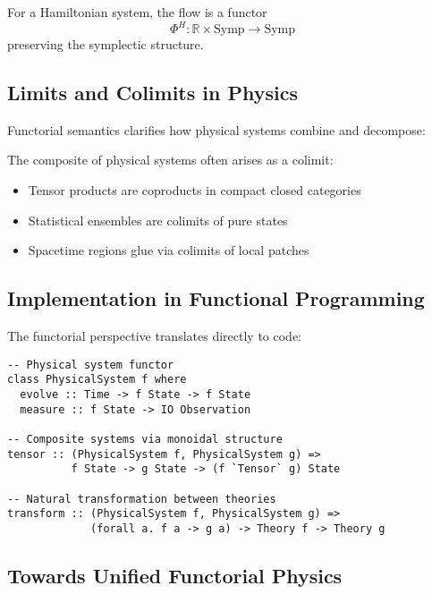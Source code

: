 \begin{example}
For a Hamiltonian system, the flow is a functor
\[
\Phi^H: \mathbb{R} \times \text{Symp} \to \text{Symp}
\]
preserving the symplectic structure.
\end{example}

\subsection{Limits and Colimits in Physics}

Functorial semantics clarifies how physical systems combine and decompose:

\begin{theorem}
The composite of physical systems often arises as a colimit:
\begin{itemize}
\item Tensor products are coproducts in compact closed categories
\item Statistical ensembles are colimits of pure states
\item Spacetime regions glue via colimits of local patches
\end{itemize}
\end{theorem}

\subsection{Implementation in Functional Programming}

The functorial perspective translates directly to code:

\begin{example}
\begin{verbatim}
-- Physical system functor
class PhysicalSystem f where
  evolve :: Time -> f State -> f State
  measure :: f State -> IO Observation
  
-- Composite systems via monoidal structure  
tensor :: (PhysicalSystem f, PhysicalSystem g) => 
          f State -> g State -> (f `Tensor` g) State
          
-- Natural transformation between theories
transform :: (PhysicalSystem f, PhysicalSystem g) =>
             (forall a. f a -> g a) -> Theory f -> Theory g
\end{verbatim}
\end{example}

\subsection{Towards Unified Functorial Physics}

